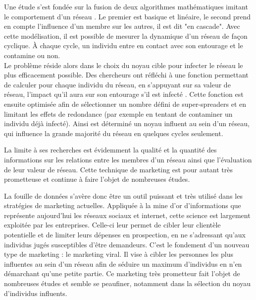 Une étude s'est fondée sur la fusion de deux algorithmes mathématiques imitant le comportement d'un réseau \cite{kdd02b}. Le premier est basique et linéaire, le second  prend en compte l'influence d'un membre sur les autres, il est dit "en cascade". Avec cette modélisation, il est possible de mesurer la dynamique d'un réseau de façon cyclique. À chaque cycle, un individu entre en contact avec son entourage et le contamine ou non.\\
Le problème réside alors dans le choix du noyau cible pour infecter le réseau le plus efficacement possible. Des chercheurs ont réfléchi à une fonction permettant de calculer pour chaque individu du réseau, en s'appuyant sur sa valeur de réseau, l'impact qu'il aura sur son entourage s'il est infecté \cite{MSNVM}. Cette fonction est ensuite optimisée afin de sélectionner un nombre défini de super-spreaders et en limitant les effets de redondance (par exemple en tentant de contaminer un individu déjà infecté). Ainsi est déterminé un noyau influent au sein d'un réseau, qui influence la grande majorité du réseau en quelques cycles seulement.

La limite à ses recherches est évidemment la qualité et la quantité des informations sur les relations entre les membres d'un réseau ainsi que l'évaluation de leur valeur de réseau. Cette technique de marketing est pour autant très prometteuse et continue à faire l'objet de nombreuses études.

La fouille de données s'avère donc être un outil puissant et très utilisé dans les stratégies de marketing actuelles. Appliquée à la mine d'or d'informations que représente aujourd'hui les réseaux sociaux et internet, cette science est largement exploitée par les entreprises. Celle-ci leur permet de cibler leur clientèle potentielle et de limiter leurs dépenses en prospection, en ne s'adressant qu'aux individus jugés susceptibles d'être demandeurs. C'est le fondement d'un nouveau type de marketing : le marketing viral. Il vise à cibler les personnes les plus influentes au sein d'un réseau afin de séduire un maximum d'individus en n'en démarchant qu'une petite partie. Ce marketing très prometteur fait l'objet de nombreuses études et semble se peaufiner, notamment dans la sélection du noyau d'individus influents.
